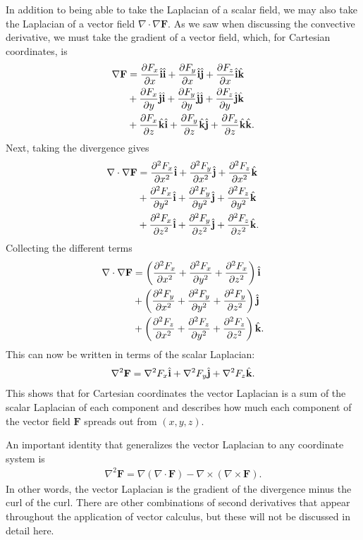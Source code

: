In addition to being able to take the Laplacian of a scalar field, we may also take the Laplacian of a vector field $\nabla \cdot \nabla \mathbf{F}$. As we saw when discussing the convective derivative, we must take the gradient of a vector field, which, for Cartesian coordinates, is 
\begin{align}
  \nabla \mathbf{F} 
  &= \dho{F_x}{x} \ihat \ihat + \dho{F_y}{x} \ihat \jhat + \dho{F_z}{x} \ihat \khat \nonumber \\
  &+ \dho{F_x}{y} \jhat \ihat + \dho{F_y}{y} \jhat \jhat + \dho{F_z}{y} \jhat \khat \nonumber \\
  &+ \dho{F_x}{z} \khat \ihat + \dho{F_y}{z} \khat \jhat + \dho{F_z}{z} \khat \khat . \nonumber
\end{align}
Next, taking the divergence gives
\begin{align}
  \nabla \cdot \nabla \mathbf{F} 
  &= \dhotwo{F_x}{x} \ihat + \dhotwo{F_y}{x} \jhat + \dhotwo{F_z}{x} \khat \nonumber \\
  &+ \dhotwo{F_x}{y} \ihat + \dhotwo{F_y}{y} \jhat + \dhotwo{F_z}{y} \khat \nonumber \\
  &+ \dhotwo{F_x}{z} \ihat + \dhotwo{F_y}{z} \jhat + \dhotwo{F_z}{z} \khat .
\end{align}
Collecting the different terms
\begin{align}
  \nabla \cdot \nabla \mathbf{F} 
  &= \left( \dhotwo{F_x}{x} + \dhotwo{F_x}{y} + \dhotwo{F_x}{z} \right) \ihat \nonumber \\
  &+ \left( \dhotwo{F_y}{x} + \dhotwo{F_y}{y} + \dhotwo{F_y}{z} \right) \jhat \nonumber \\
  &+ \left( \dhotwo{F_z}{x} + \dhotwo{F_z}{y} + \dhotwo{F_z}{z} \right) \khat . 
\end{align}
This can now be written in terms of the scalar Laplacian:
\begin{align}
  \nabla^2 \mathbf{F} = \nabla^2 F_x \ihat + \nabla^2 F_y \jhat + \nabla^2 F_z \khat .
\end{align}
This shows that for Cartesian coordinates the vector Laplacian is a sum of the scalar Laplacian of each component and describes how much each component of the vector field $\mathbf{F}$ spreads out from $(x,y,z)$.

An important identity that generalizes the vector Laplacian to any coordinate system is
\begin{align}
  \nabla^2 \mathbf{F} = \nabla ( \nabla \cdot \mathbf{F} ) - \nabla \times ( \nabla \times \mathbf{F} ).
\end{align}
In other words, the vector Laplacian is the gradient of the divergence minus the curl of the curl. There are other combinations of second derivatives that appear throughout the application of vector calculus, but these will not be discussed in detail here.


